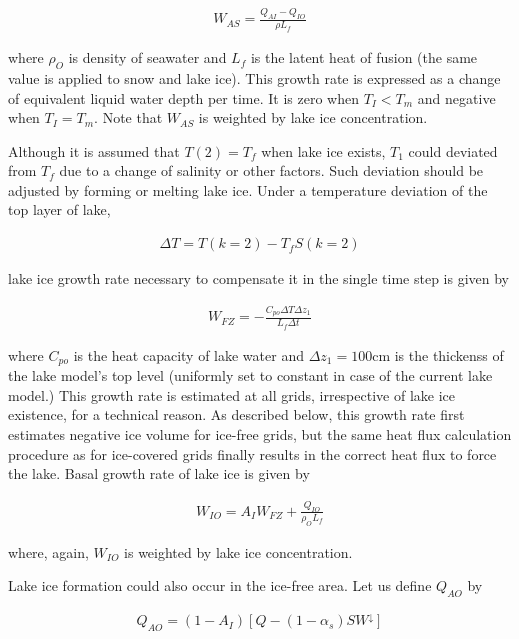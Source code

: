 \begin{eqnarray}
    W_{AS} = \frac{Q_{AI}-Q_{IO}}{\rho L_f}
\end{eqnarray}

where \(\rho_O\) is density of seawater and \(L_f\) is the latent heat
of fusion (the same value is applied to snow and lake ice). This growth
rate is expressed as a change of equivalent liquid water depth per time.
It is zero when \(T_I < T_m\) and negative when \(T_I = T_m\). Note that
\(W_{AS}\) is weighted by lake ice concentration.

Although it is assumed that \(T(2) = T_f\) when lake ice exists, \(T_1\)
could deviated from \(T_f\) due to a change of salinity or other
factors. Such deviation should be adjusted by forming or melting lake
ice. Under a temperature deviation of the top layer of lake,

\begin{eqnarray}
    \Delta T = T(k=2) - T_f S(k=2)
\end{eqnarray}

lake ice growth rate necessary to compensate it in the single time step
is given by

\begin{eqnarray}
    W_{FZ} = - \frac{C_{po} \Delta T \Delta z_1}{L_f \Delta t}
\end{eqnarray}

where \(C_{po}\) is the heat capacity of lake water and
\(\Delta z_1=100 \mathrm{cm}\) is the thickenss of the lake model's top
level (uniformly set to constant in case of the current lake model.)
This growth rate is estimated at all grids, irrespective of lake ice
existence, for a technical reason. As described below, this growth rate
first estimates negative ice volume for ice-free grids, but the same
heat flux calculation procedure as for ice-covered grids finally results
in the correct heat flux to force the lake. Basal growth rate of lake
ice is given by

\begin{eqnarray}
    W_{IO} = A_I W_{FZ} + \frac{Q_{IO}}{\rho_OL_f}
\end{eqnarray}

where, again, \(W_{IO}\) is weighted by lake ice concentration.

Lake ice formation could also occur in the ice-free area. Let us define
\(Q_{AO}\) by

\begin{eqnarray}
    Q_{AO} = (1-A_{I}) [Q-(1-\alpha_s)SW^\downarrow]
\end{eqnarray}

